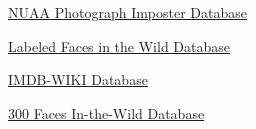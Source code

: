 \documentclass[a4paper,14pt]{extarticle}
\begin{document}
\begin{thebibliography}{0}
        \hypertarget{NUAA}{}
        \href{http://parnec.nuaa.edu.cn/xtan/data/nuaaimposterdb.html}
        {NUAA Photograph Imposter Database}

        \hypertarget{lfw}{}
        \href{http://vis-www.cs.umass.edu/lfw/}
        {Labeled Faces in the Wild Database}

        \hypertarget{IMDB-WIKI}{}
        \href{https://data.vision.ee.ethz.ch/cvl/rrothe/imdb-wiki/}
        {IMDB-WIKI Database}

        \hypertarget{bug}{}
        \href{https://ibug.doc.ic.ac.uk/resources/300-W/}
        {300 Faces In-the-Wild Database}

    \end{thebibliography}
\end{document}
